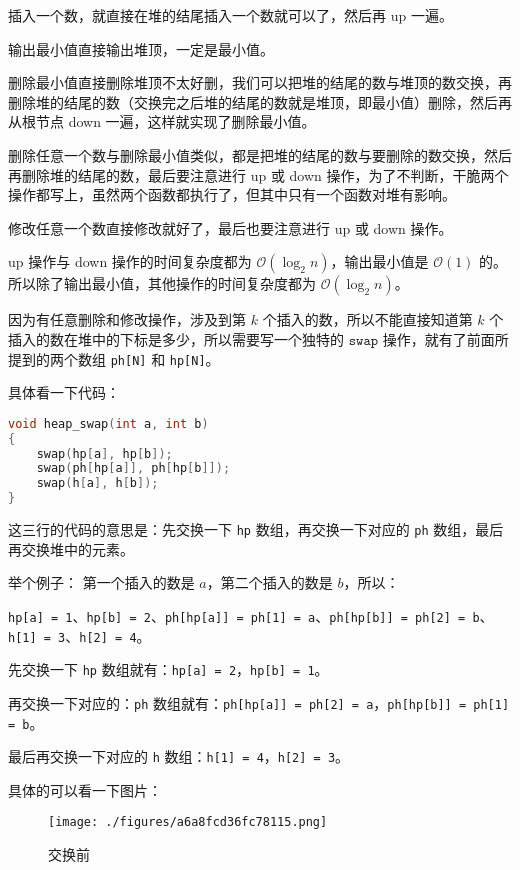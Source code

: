 插入一个数，就直接在堆的结尾插入一个数就可以了，然后再 up 一遍。

输出最小值直接输出堆顶，一定是最小值。

删除最小值直接删除堆顶不太好删，我们可以把堆的结尾的数与堆顶的数交换，再删除堆的结尾的数（交换完之后堆的结尾的数就是堆顶，即最小值）删除，然后再从根节点 down 一遍，这样就实现了删除最小值。

删除任意一个数与删除最小值类似，都是把堆的结尾的数与要删除的数交换，然后再删除堆的结尾的数，最后要注意进行 up 或 down 操作，为了不判断，干脆两个操作都写上，虽然两个函数都执行了，但其中只有一个函数对堆有影响。

修改任意一个数直接修改就好了，最后也要注意进行 up 或 down 操作。

up 操作与 down 操作的时间复杂度都为 $\mathcal{O}(\log_2 n)$，输出最小值是 $\mathcal{O}(1)$ 的。所以除了输出最小值，其他操作的时间复杂度都为 $\mathcal{O}(\log_2 n)$。

因为有任意删除和修改操作，涉及到第 $k$ 个插入的数，所以不能直接知道第 $k$ 个插入的数在堆中的下标是多少，所以需要写一个独特的 $\mathtt{swap}$ 操作，就有了前面所提到的两个数组 \verb|ph[N]| 和 \verb|hp[N]|。

具体看一下代码：

\begin{lstlisting}[language=cpp]
void heap_swap(int a, int b)
{
    swap(hp[a], hp[b]);
    swap(ph[hp[a]], ph[hp[b]]);
    swap(h[a], h[b]);
}
\end{lstlisting}

这三行的代码的意思是：先交换一下 \verb|hp| 数组，再交换一下对应的 \verb|ph| 数组，最后再交换堆中的元素。

举个例子：
第一个插入的数是 $a$，第二个插入的数是 $b$，所以：

\verb|hp[a] = 1|、\verb|hp[b] = 2|、\verb|ph[hp[a]] = ph[1] = a|、\verb|ph[hp[b]] = ph[2] = b|、\verb|h[1] = 3|、\verb|h[2] = 4|。

先交换一下 \verb|hp| 数组就有：\verb|hp[a] = 2|，\verb|hp[b] = 1|。

再交换一下对应的：\verb|ph| 数组就有：\verb|ph[hp[a]] = ph[2] = a|，\verb|ph[hp[b]] = ph[1] = b|。

最后再交换一下对应的 \verb|h| 数组：\verb|h[1] = 4|，\verb|h[2] = 3|。

具体的可以看一下图片：
\begin{figure}[ht]
\centering
\texttt{[image: ./figures/a6a8fcd36fc78115.png]}
\caption{交换前} \label{fig_heap_1}
\end{figure}


